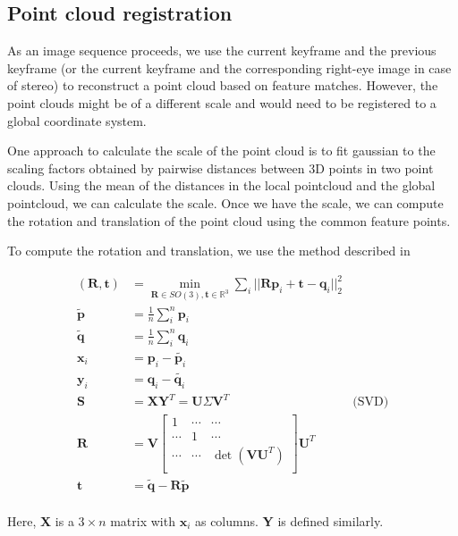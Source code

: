 \documentclass{article}
\begin{document}
\subsection{Point cloud registration}
As an image sequence proceeds, we use the current keyframe and the previous keyframe (or the current keyframe and the corresponding right-eye image in case of stereo) to reconstruct a point cloud based on feature matches. However, the point clouds might be of a different scale and would need to be registered to a global coordinate system.

One approach to calculate the scale of the point cloud is to fit gaussian to the scaling factors obtained by pairwise distances between 3D points in two point clouds. Using the mean of the distances in the local pointcloud and the global pointcloud, we can calculate the scale. Once we have the scale, we can compute the rotation and translation of the point cloud using the common feature points.

To compute the rotation and translation, we use the method described in \citep{rigid}

\begin{align*}
    (\textbf{R}, \textbf{t}) &= \min_{\textbf{R} \in SO(3), \textbf{t} \in \mathbb{R}^{3}} \sum_i || \textbf{Rp}_i + \textbf{t} - \textbf{q}_i||^{2}_{2}\\
    \tilde{\textbf{p}} &= \frac{1}{n} \sum_i^{n} \textbf{p}_i\\
    \tilde{\textbf{q}} &= \frac{1}{n} \sum_i^{n} \textbf{q}_i\\
    \textbf{x}_i &= \textbf{p}_i - \tilde{\textbf{p}_i}\\
    \textbf{y}_i &= \textbf{q}_i - \tilde{\textbf{q}_i}\\
    \textbf{S} &= \textbf{XY}^{T} = \textbf{U}\Sigma\textbf{V}^{T} & \text{(SVD)}\\
    \textbf{R} &= \textbf{V} \begin{bmatrix}
        1 & \cdots & \cdots\\
        \cdots & 1 & \cdots\\
        \cdots & \cdots & \det(\textbf{VU}^{T})\\
    \end{bmatrix} \textbf{U}^{T}\\
    \textbf{t} &= \tilde{\textbf{q}} - \textbf{R}\tilde{\textbf{p}}\\
\end{align*}

Here, \textbf{X} is a $3\times n$ matrix with $\textbf{x}_i$ as columns. \textbf{Y} is defined similarly.
\end{document}
